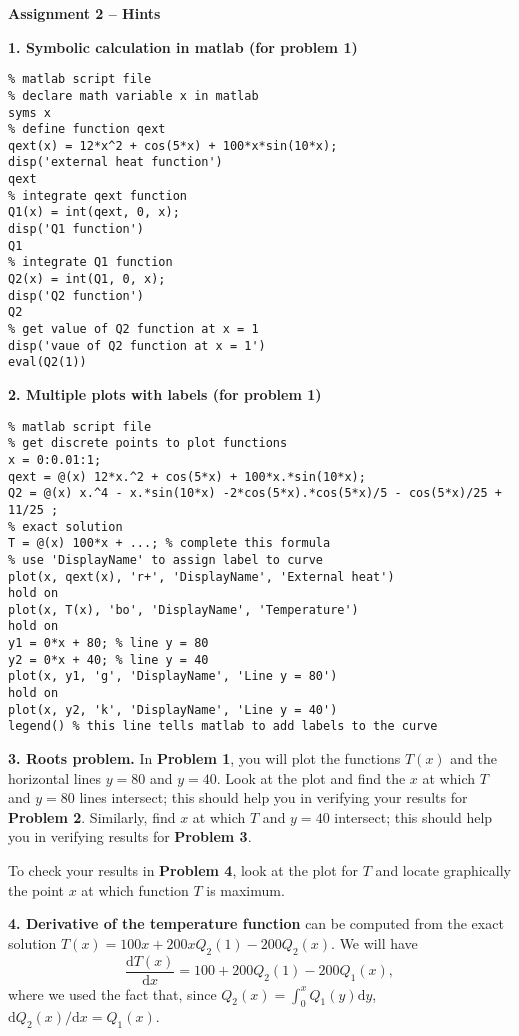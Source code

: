\documentclass[11pt,a4paper]{report}
\newcommand{\dd}{\mathrm{d}}
\begin{document}
\begin{center} 
\textbf{Assignment 2 -- Hints} 
\end{center}


\vspace{10pt}
\noindent\textbf{1. Symbolic calculation in matlab (for problem 1)}
  \begin{verbatim}
% matlab script file
% declare math variable x in matlab
syms x
% define function qext
qext(x) = 12*x^2 + cos(5*x) + 100*x*sin(10*x);
disp('external heat function')
qext
% integrate qext function
Q1(x) = int(qext, 0, x);
disp('Q1 function')
Q1
% integrate Q1 function
Q2(x) = int(Q1, 0, x);
disp('Q2 function')
Q2
% get value of Q2 function at x = 1
disp('vaue of Q2 function at x = 1')
eval(Q2(1))
  \end{verbatim}

\vspace{10pt}
\noindent\textbf{2. Multiple plots with labels (for problem 1)}
  \begin{verbatim}
% matlab script file
% get discrete points to plot functions
x = 0:0.01:1; 
qext = @(x) 12*x.^2 + cos(5*x) + 100*x.*sin(10*x); 
Q2 = @(x) x.^4 - x.*sin(10*x) -2*cos(5*x).*cos(5*x)/5 - cos(5*x)/25 + 11/25 ;
% exact solution
T = @(x) 100*x + ...; % complete this formula
% use 'DisplayName' to assign label to curve
plot(x, qext(x), 'r+', 'DisplayName', 'External heat') 
hold on
plot(x, T(x), 'bo', 'DisplayName', 'Temperature')
hold on
y1 = 0*x + 80; % line y = 80 
y2 = 0*x + 40; % line y = 40
plot(x, y1, 'g', 'DisplayName', 'Line y = 80')
hold on
plot(x, y2, 'k', 'DisplayName', 'Line y = 40')
legend() % this line tells matlab to add labels to the curve
  \end{verbatim}
  
\vspace{10pt}
\noindent\textbf{3. Roots problem.} In \textbf{Problem 1}, you will plot the functions $T(x)$ and the horizontal lines $y=80$ and $y=40$. Look at the plot and find the $x$ at which $T$ and $y=80$ lines intersect; this should help you in verifying your results for \textbf{Problem 2}. Similarly, find $x$ at which $T$ and $y=40$ intersect; this should help you in verifying results for \textbf{Problem 3}. 

To check your results in \textbf{Problem 4}, look at the plot for $T$ and locate graphically the point $x$ at which function $T$ is maximum. 

\vspace{10pt}
\noindent\textbf{4. Derivative of the temperature function} can be computed from the exact solution $T(x) = 100 x + 200 x Q_2(1) - 200 Q_2(x)$. We will have
\begin{equation}
\frac{\dd T(x)}{\dd x} = 100 + 200 Q_2(1) - 200 Q_1(x),
\end{equation}
where we used the fact that, since $Q_2(x) = \int_0^x Q_1(y) \dd y$, $\dd Q_2(x) / \dd x = Q_1(x)$. 
\end{document}
